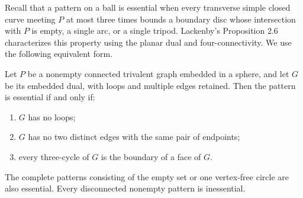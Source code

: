Recall that a pattern on a ball is essential when every transverse simple
closed curve meeting $P$ at most three times bounds a boundary disc whose
intersection with $P$ is empty, a single arc, or a single tripod.
Lackenby's Proposition 2.6 \cite{lackenby2026} characterizes this property using the planar
dual and four-connectivity.  We use the following equivalent form.

\begin{theorem}
\label{thm:terminal-triangle}
Let $P$ be a nonempty connected trivalent graph embedded in a sphere, and
let $G$ be its embedded dual, with loops and multiple edges retained.
Then the pattern is essential if and only if:
\begin{enumerate}
\item $G$ has no loops;
\item $G$ has no two distinct edges with the same pair of endpoints;
\item every three-cycle of $G$ is the boundary of a face of $G$.
\end{enumerate}
The complete patterns consisting of the empty set or one vertex-free
circle are also essential.  Every disconnected nonempty pattern is
inessential.
\end{theorem}

